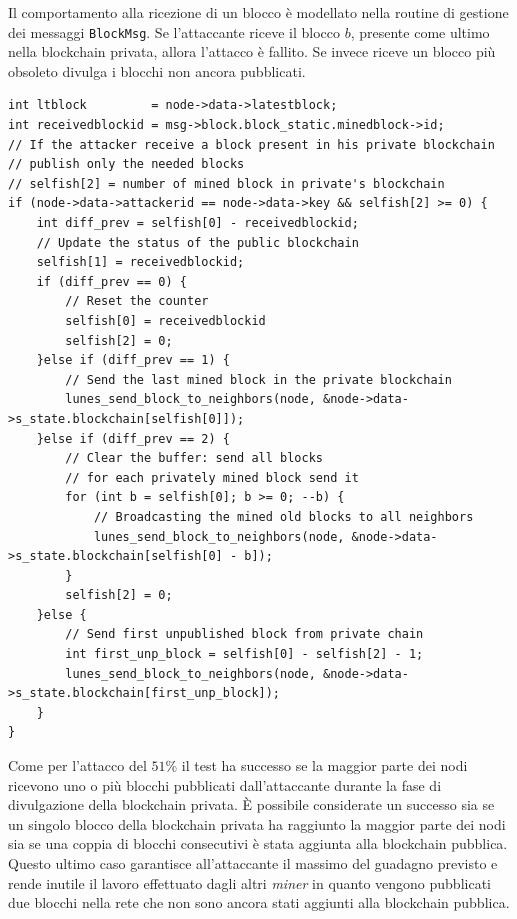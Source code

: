 Il comportamento alla ricezione di un blocco è modellato nella routine di gestione dei messaggi \texttt{BlockMsg}. Se l'attaccante riceve il blocco $b$, presente come ultimo nella blockchain privata, allora l'attacco è fallito. Se invece riceve un blocco più obsoleto divulga i blocchi non ancora pubblicati.
\clearpage
\begin{code}
\begin{verbatim}
int ltblock         = node->data->latestblock;
int receivedblockid = msg->block.block_static.minedblock->id;
// If the attacker receive a block present in his private blockchain
// publish only the needed blocks
// selfish[2] = number of mined block in private's blockchain
if (node->data->attackerid == node->data->key && selfish[2] >= 0) {
    int diff_prev = selfish[0] - receivedblockid;
    // Update the status of the public blockchain
    selfish[1] = receivedblockid;
    if (diff_prev == 0) {
        // Reset the counter
        selfish[0] = receivedblockid
        selfish[2] = 0;
    }else if (diff_prev == 1) {
        // Send the last mined block in the private blockchain
        lunes_send_block_to_neighbors(node, &node->data->s_state.blockchain[selfish[0]]);
    }else if (diff_prev == 2) {
        // Clear the buffer: send all blocks
        // for each privately mined block send it
        for (int b = selfish[0]; b >= 0; --b) {
            // Broadcasting the mined old blocks to all neighbors
            lunes_send_block_to_neighbors(node, &node->data->s_state.blockchain[selfish[0] - b]);
        }
        selfish[2] = 0;
    }else {
        // Send first unpublished block from private chain
        int first_unp_block = selfish[0] - selfish[2] - 1;
        lunes_send_block_to_neighbors(node, &node->data->s_state.blockchain[first_unp_block]);
    }
}
\end{verbatim}
\end{code}
Come per l'attacco del $51\%$ il test ha successo se la maggior parte dei nodi ricevono uno o più blocchi pubblicati dall'attaccante durante la fase di divulgazione della blockchain privata.\newline
È possibile considerate un successo sia se un singolo blocco della blockchain privata ha raggiunto la maggior parte dei nodi sia se una coppia di blocchi consecutivi è stata aggiunta alla blockchain pubblica. Questo ultimo caso garantisce all'attaccante il massimo del guadagno previsto e rende inutile il lavoro effettuato dagli altri \textit{miner} in quanto vengono pubblicati due blocchi nella rete che non sono ancora stati aggiunti alla blockchain pubblica.\newline
